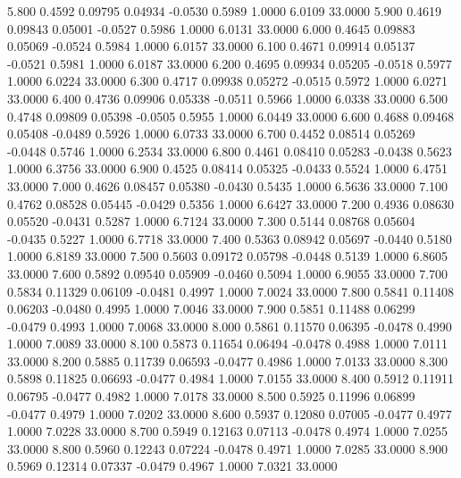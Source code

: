    5.800   0.4592   0.09795   0.04934  -0.0530   0.5989   1.0000   6.0109  33.0000
   5.900   0.4619   0.09843   0.05001  -0.0527   0.5986   1.0000   6.0131  33.0000
   6.000   0.4645   0.09883   0.05069  -0.0524   0.5984   1.0000   6.0157  33.0000
   6.100   0.4671   0.09914   0.05137  -0.0521   0.5981   1.0000   6.0187  33.0000
   6.200   0.4695   0.09934   0.05205  -0.0518   0.5977   1.0000   6.0224  33.0000
   6.300   0.4717   0.09938   0.05272  -0.0515   0.5972   1.0000   6.0271  33.0000
   6.400   0.4736   0.09906   0.05338  -0.0511   0.5966   1.0000   6.0338  33.0000
   6.500   0.4748   0.09809   0.05398  -0.0505   0.5955   1.0000   6.0449  33.0000
   6.600   0.4688   0.09468   0.05408  -0.0489   0.5926   1.0000   6.0733  33.0000
   6.700   0.4452   0.08514   0.05269  -0.0448   0.5746   1.0000   6.2534  33.0000
   6.800   0.4461   0.08410   0.05283  -0.0438   0.5623   1.0000   6.3756  33.0000
   6.900   0.4525   0.08414   0.05325  -0.0433   0.5524   1.0000   6.4751  33.0000
   7.000   0.4626   0.08457   0.05380  -0.0430   0.5435   1.0000   6.5636  33.0000
   7.100   0.4762   0.08528   0.05445  -0.0429   0.5356   1.0000   6.6427  33.0000
   7.200   0.4936   0.08630   0.05520  -0.0431   0.5287   1.0000   6.7124  33.0000
   7.300   0.5144   0.08768   0.05604  -0.0435   0.5227   1.0000   6.7718  33.0000
   7.400   0.5363   0.08942   0.05697  -0.0440   0.5180   1.0000   6.8189  33.0000
   7.500   0.5603   0.09172   0.05798  -0.0448   0.5139   1.0000   6.8605  33.0000
   7.600   0.5892   0.09540   0.05909  -0.0460   0.5094   1.0000   6.9055  33.0000
   7.700   0.5834   0.11329   0.06109  -0.0481   0.4997   1.0000   7.0024  33.0000
   7.800   0.5841   0.11408   0.06203  -0.0480   0.4995   1.0000   7.0046  33.0000
   7.900   0.5851   0.11488   0.06299  -0.0479   0.4993   1.0000   7.0068  33.0000
   8.000   0.5861   0.11570   0.06395  -0.0478   0.4990   1.0000   7.0089  33.0000
   8.100   0.5873   0.11654   0.06494  -0.0478   0.4988   1.0000   7.0111  33.0000
   8.200   0.5885   0.11739   0.06593  -0.0477   0.4986   1.0000   7.0133  33.0000
   8.300   0.5898   0.11825   0.06693  -0.0477   0.4984   1.0000   7.0155  33.0000
   8.400   0.5912   0.11911   0.06795  -0.0477   0.4982   1.0000   7.0178  33.0000
   8.500   0.5925   0.11996   0.06899  -0.0477   0.4979   1.0000   7.0202  33.0000
   8.600   0.5937   0.12080   0.07005  -0.0477   0.4977   1.0000   7.0228  33.0000
   8.700   0.5949   0.12163   0.07113  -0.0478   0.4974   1.0000   7.0255  33.0000
   8.800   0.5960   0.12243   0.07224  -0.0478   0.4971   1.0000   7.0285  33.0000
   8.900   0.5969   0.12314   0.07337  -0.0479   0.4967   1.0000   7.0321  33.0000
